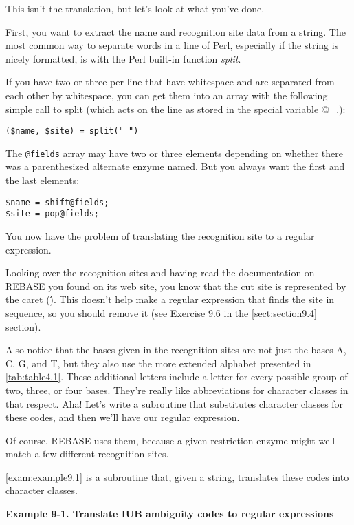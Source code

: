 This isn't the translation, but let's look at what you've done.

First, you want to extract the name and recognition site data from a string. The most common way to separate words in a line of Perl, especially if the string is nicely formatted, is with the Perl built-in function \textit{split}.

If you have two or three per line that have whitespace and are separated from each other by whitespace, you can get them into an array with the following simple call to split (which acts on the line as stored in the special variable @\_.):

\begin{lstlisting}
($name, $site) = split(" ")
\end{lstlisting}

The \verb|@fields| array may have two or three elements depending on whether there was a parenthesized alternate enzyme named. But you always want the first and the last elements: 

\begin{lstlisting}
$name = shift@fields;
$site = pop@fields;
\end{lstlisting}

You now have the problem of translating the recognition site to a regular expression.

Looking over the recognition sites and having read the documentation on REBASE you found on its web site, you know that the cut site is represented by the caret (\^). This doesn't help make a regular expression that finds the site in sequence, so you should remove it (see Exercise 9.6 in the \autoref{sect:section9.4} section).

Also notice that the bases given in the recognition sites are not just the bases A, C, G, and T, but they also use the more extended alphabet presented in \autoref{tab:table4.1}. These additional letters include a letter for every possible group of two, three, or four bases. They're really like abbreviations for character classes in that respect. Aha! Let's write a subroutine that substitutes character classes for these codes, and then we'll have our regular expression.

Of course, REBASE uses them, because a given restriction enzyme might well match a few different recognition sites.

\autoref{exam:example9.1} is a subroutine that, given a string, translates these codes into character classes. 

\textbf{Example 9-1. Translate IUB ambiguity codes to regular expressions}


